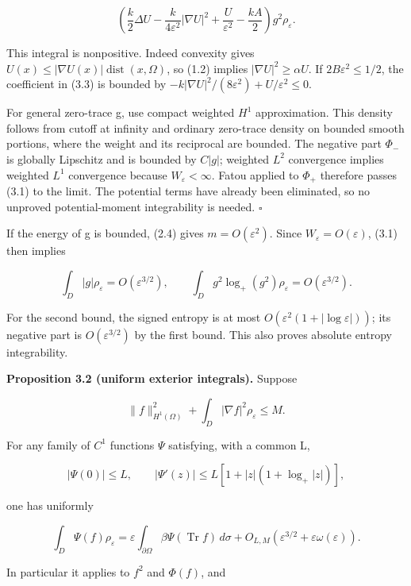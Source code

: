 \documentclass[11pt]{article}
\begin{document}
\[\left(\frac k2\Delta U-\frac{k}{4\varepsilon^2}|\nabla U|^2
+\frac{U}{\varepsilon^2}-\frac{kA}{2}\right)g^2\rho_\varepsilon.\tag{3.3}\]

This integral is nonpositive. Indeed convexity gives
\(U(x)\leq |\nabla U(x)|\operatorname{dist}(x,\Omega )\), so (1.2)
implies \(|\nabla U|^{2}\geq \alpha U\). If
\(2B\varepsilon ^{2}\leq 1/2\), the coefficient in (3.3) is bounded by
\(-k|\nabla U|^{2}/(8\varepsilon ^{2})+U/\varepsilon ^{2}\leq 0\).

For general zero-trace g, use compact weighted \(H^{1}\) approximation.
This density follows from cutoff at infinity and ordinary zero-trace
density on bounded smooth portions, where the weight and its reciprocal
are bounded. The negative part \(\Phi_-\) is globally Lipschitz and is
bounded by \(C|g|\); weighted \(L^{2}\) convergence implies weighted
\(L^{1}\) convergence because \(W_\varepsilon <\infty\). Fatou applied
to \(\Phi _+\) therefore passes (3.1) to the limit. The potential terms
have already been eliminated, so no unproved potential-moment
integrability is needed. \(\square\)

If the energy of g is bounded, (2.4) gives \(m=O(\varepsilon ^{2})\).
Since \(W_\varepsilon =O(\varepsilon )\), (3.1) then implies

\[\int_D|g|\rho_\varepsilon=O(\varepsilon^{3/2}),\qquad
\int_Dg^2\log_+(g^2)\rho_\varepsilon=O(\varepsilon^{3/2}).\tag{3.4}\]

For the second bound, the signed entropy is at most
\(O(\varepsilon^2(1+|\log\varepsilon|))\); its negative part is
\(O(\varepsilon ^{3/2})\) by the first bound. This also proves absolute
entropy integrability.

\textbf{Proposition 3.2 (uniform exterior integrals).} Suppose

\[\|f\|_{H^1(\Omega)}^2+\int_D|\nabla f|^2\rho_\varepsilon\leq M.\tag{3.5}\]

For any family of \(C^{1}\) functions \(\Psi\) satisfying, with a common
L,

\[|\Psi(0)|\leq L,\qquad
|\Psi'(z)|\leq L[1+|z|(1+\log_+|z|)],\tag{3.6}\]

one has uniformly

\[\int_D\Psi(f)\rho_\varepsilon
=\varepsilon\int_{\partial\Omega}\beta\Psi(\operatorname{Tr}f)\,d\sigma
+O_{L,M}(\varepsilon^{3/2}+\varepsilon\omega(\varepsilon)).\tag{3.7}\]

In particular it applies to \(f^{2}\) and \(\Phi (f)\), and
\end{document}
